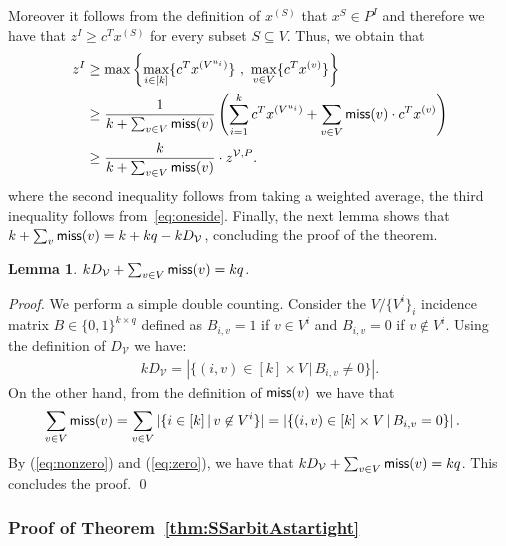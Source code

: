 \documentclass[smallextended]{svjour3}
\newtheorem{lemma}[proposition]{Lemma}
\begin{document}
	Moreover it follows from the definition of $x^{(S)}$ that $x^{S} \in P^I$ and therefore we have that $z^I \ge c^T x^{(S)}$ for every subset $S \subseteq V$. Thus, we obtain that
	\begin{align*}
		z^I &\geq \max \left\{ \max_{i \in [k]} \{ c^T x^{(V^{u_i})} \} ~,~ \max_{v \in V} \{ c^T x^{(v)} \} \right\} \\
		&\geq \frac{1}{k + \sum_{v \in V} {{\sf miss}}(v)} \left(\sum_{i = 1}^k c^T x^{(V^{u_i})} + \sum_{v \in V} {{\sf miss}}(v) \cdot c^T x^{(v)} \right) \\
		&\geq \frac{k}{k + \sum_{v \in V} {{\sf miss}}(v)} \cdot z^{\mathcal{V}, P}.
	\end{align*}
where the second inequality follows from taking a weighted average, the third inequality follows from~\eqref{eq:oneside}. Finally, the next lemma shows that $k + \sum_v {{\sf miss}}(v) = k + kq - kD_{\mathcal{V}}$, concluding the proof of the theorem. 

	\begin{lemma}
		$kD_{\mathcal{V}} + \sum_{v \in V} {{\sf miss}}(v) = kq$.
	\end{lemma}
	
	\begin{proof}
		We perform a simple double counting. Consider the $V/\{V^i\}_i$ incidence matrix $B \in \{0,1\}^{k \times q}$ defined as $B_{i,v} = 1$ if $v \in V^i$ and $B_{i,v} = 0$ if $v \notin V^i$. Using the definition of $D_{\mathcal{V}}$ we have:
	\begin{eqnarray}
		\label{eq:nonzero} k D_{\mathcal{V}} = \left| \{ (i,v) \in [k]\times V\,|\, B_{i,v} \neq 0\}\right|.
	\end{eqnarray} 
On the other hand, from the definition of ${{\sf miss}}(v)$ we have that
	\begin{align}
		\sum_{v \in V} {{\sf miss}}(v) &= \sum_{v \in V} |\{i \in [k]\,|\, v \not \in V^i\}| = \left| \{ (i,v) \in [k]\times V\,|\, B_{i,v} = 0\}\right|. \label{eq:zero}
	\end{align}
By (\ref{eq:nonzero}) and (\ref{eq:zero}), we have that $kD_{\mathcal{V}} + \sum_{v \in V} {{\sf miss}}(v) = kq$. This concludes the proof.{
\ifmp
	\hfill \qed
\fi
}
	\end{proof}

\subsubsection{Proof of Theorem~\ref{thm:SSarbitAstartight}}
\end{document}
